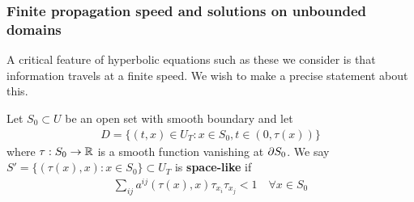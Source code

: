 \documentclass[12pt,a4paper]{report}
\begin{document}
\newday
\s

\subsubsection*{Finite propagation speed and solutions on unbounded domains}

A critical feature of hyperbolic equations such as these we consider is that information travels at a finite speed. We wish to make a precise statement about this.

\quad Let $S_0 \subset U$ be an open set with smooth boundary and let
\begin{align*}
D = \{ (t,x) \in U_T : x\in S_0, t\in (0, \tau(x)) \}
\end{align*}
where $\tau : S_0 \rightarrow \mathbb{R}$ is a smooth function vanishing at $\partial S_0$. We say $S' = \{ (\tau(x), x) : x\in S_0 \} \subset U_T$ is \textbf{space-like} if 
\begin{align*}
\sum_{ij} a^{ij} (\tau(x),x) \tau_{x_i} \tau_{x_j} < 1 \quad \forall x\in S_0
\end{align*}
\s
\end{document}
